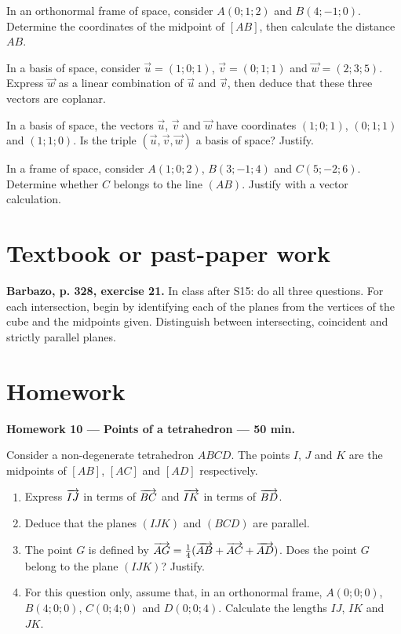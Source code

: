 In an orthonormal frame of space, consider $A(0;1;2)$ and $B(4;-1;0)$. Determine the coordinates of the midpoint of $[AB]$, then calculate the distance $AB$.

In a basis of space, consider $\vec u=(1;0;1)$, $\vec v=(0;1;1)$ and $\vec w=(2;3;5)$. Express $\vec w$ as a linear combination of $\vec u$ and $\vec v$, then deduce that these three vectors are coplanar.

In a basis of space, the vectors $\vec u$, $\vec v$ and $\vec w$ have coordinates $(1;0;1)$, $(0;1;1)$ and $(1;1;0)$. Is the triple $(\vec u,\vec v,\vec w)$ a basis of space? Justify.

In a frame of space, consider $A(1;0;2)$, $B(3;-1;4)$ and $C(5;-2;6)$. Determine whether $C$ belongs to the line $(AB)$. Justify with a vector calculation.

\section{Textbook or past-paper work}\textbf{Barbazo, p. 328, exercise 21.} In class after S15: do all three questions. For each intersection, begin by identifying each of the planes from the vertices of the cube and the midpoints given. Distinguish between intersecting, coincident and strictly parallel planes.

\section{Homework}\textbf{Homework 10 --- Points of a tetrahedron --- 50 min.}\par Consider a non-degenerate tetrahedron $ABCD$. The points $I$, $J$ and $K$ are the midpoints of $[AB]$, $[AC]$ and $[AD]$ respectively.
\begin{enumerate}\item Express $\overrightarrow{IJ}$ in terms of $\overrightarrow{BC}$ and $\overrightarrow{IK}$ in terms of $\overrightarrow{BD}$.
\item Deduce that the planes $(IJK)$ and $(BCD)$ are parallel.
\item The point $G$ is defined by $\overrightarrow{AG}=\frac14(\overrightarrow{AB}+\overrightarrow{AC}+\overrightarrow{AD})$. Does the point $G$ belong to the plane $(IJK)$? Justify.
\item For this question only, assume that, in an orthonormal frame, $A(0;0;0)$, $B(4;0;0)$, $C(0;4;0)$ and $D(0;0;4)$. Calculate the lengths $IJ$, $IK$ and $JK$.\end{enumerate}

